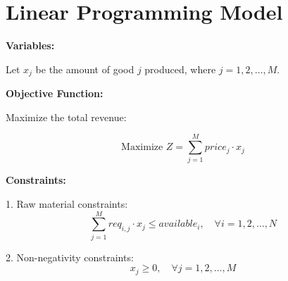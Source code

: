 \documentclass{article}
\begin{document}
\section*{Linear Programming Model}

\textbf{Variables:}

Let \( x_j \) be the amount of good \( j \) produced, where \( j = 1, 2, \ldots, M \).

\textbf{Objective Function:}

Maximize the total revenue:

\[
\text{Maximize } Z = \sum_{j=1}^{M} price_j \cdot x_j
\]

\textbf{Constraints:}

1. Raw material constraints:
\[
\sum_{j=1}^{M} req_{i,j} \cdot x_j \leq available_{i}, \quad \forall i = 1, 2, \ldots, N
\]

2. Non-negativity constraints:
\[
x_j \geq 0, \quad \forall j = 1, 2, \ldots, M
\]
\end{document}
